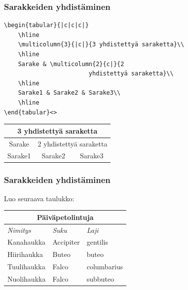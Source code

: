 \begin{fframe}
    \frametitle{Sarakkeiden yhdistäminen}
    \begin{lstlisting}
\begin{tabular}{|c|c|c|}
    \hline
    \multicolumn{3}{|c|}{3 yhdistettyä saraketta}\\
    \hline
    Sarake & \multicolumn{2}{c|}{2
                        yhdistettyä saraketta}\\
    \hline
    Sarake1 & Sarake2 & Sarake3\\
    \hline
\end{tabular}<>
    \end{lstlisting}
    \begin{serif}
        \begin{small}
            \begin{tabular}{|c|c|c|}
                \hline
                \multicolumn{3}{|c|}{3 yhdistettyä saraketta}\\
                \hline
                Sarake & \multicolumn{2}{c|}{2 yhdistettyä saraketta}\\
                \hline
                Sarake1 & Sarake2 & Sarake3\\
                \hline
            \end{tabular}
        \end{small}
    \end{serif}
\end{fframe}

\begin{fframe}
    \frametitle{Sarakkeiden yhdistäminen}

    \begin{harj}
        Luo seuraava taulukko:
        \begin{table}
            \begin{serif}
                \begin{tabular}{|l|l|l|}
                    \hline
                    \multicolumn{3}{|c|}{\textbf{Päiväpetolintuja}}\\
                    \hline
                    \textit{Nimitys} & \textit{Suku} & \textit{Laji}\\ \hline
                    Kanahaukka & Accipiter &  gentilis\\ \hline
                    Hiirihaukka & Buteo & buteo\\ \hline
                    Tuulihaukka & Falco & columbarius\\\hline
                    Nuolihaukka & Falco & subbuteo\\ \hline
                \end{tabular}
            \end{serif}
        \end{table}
    \end{harj}
\end{fframe}


